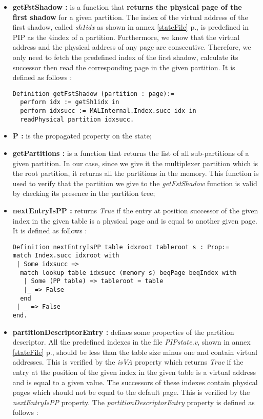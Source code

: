 \begin{itemize}
	\item \textbf{getFstShadow :} is a function that \textbf{returns the physical page of the first shadow} for a given partition. The index of the virtual address of the first shadow, called \textit{sh1idx} as shown in annex \ref{stateFile} p.\pageref{stateFile}, is predefined in PIP as the 4\rth index of a partition. Furthermore, we know that the virtual address and the physical address of any page are consecutive. Therefore, we only need to fetch the predefined index of the first shadow, calculate its successor then read the corresponding page in the given partition. It is defined as follows :
\begin{lstlisting}[caption = {getFstShadow function in the shallow embedding},label={getFstShallow}]
Definition getFstShadow (partition : page):=
  perform idx := getSh1idx in
  perform idxsucc := MALInternal.Index.succ idx in
  readPhysical partition idxsucc.
\end{lstlisting} 
\vspace{4pt}
	\item \textbf{P :} is the propagated property on the state;
	\item \textbf{getPartitions :}  is a function that returns the list of all sub-partitions of a given partition. In our case, since we give it the multiplexer partition which is the root partition, it returns all the partitions in the memory. This function is used to verify that the partition we give to the \textit{getFstShadow} function is valid by checking its presence in the partition tree;
	\item \textbf{nextEntryIsPP :}  returns \textit{True} if the entry at position successor of the given index in the given table is a physical page and is equal to another given page. It is defined as follows : 
\begin{lstlisting}[caption = {nextEntryIsPP property},mathescape=true, xleftmargin=-.1\textwidth, xrightmargin=-.05\textwidth,label={nextEnt}]
Definition nextEntryIsPP table idxroot tableroot s : Prop:= 
match Index.succ idxroot with 
 | Some idxsucc => 
  match lookup table idxsucc (memory s) beqPage beqIndex with 
   | Some (PP table) => tableroot = table
   |_ => False 
  end
 | _ => False 
end.
\end{lstlisting} 
	\item \textbf{partitionDescriptorEntry :}  defines some properties of the partition descriptor. All the predefined indexes in the file \textit{PIPstate.v}, shown in annex \ref{stateFile} p.\pageref{stateFile}, should be less than the table size minus one and contain virtual addresses. This is verified by the \textit{isVA} property which returns \textit{True} if the entry at the position of the given index in the given table is a virtual address and is equal to a given value. The successors of these indexes contain physical pages which should not be equal to the default page. This is verified by the \textit{nextEntryIsPP} property. The \textit{partitionDescriptorEntry} property is defined as follows :

\end{itemize}
